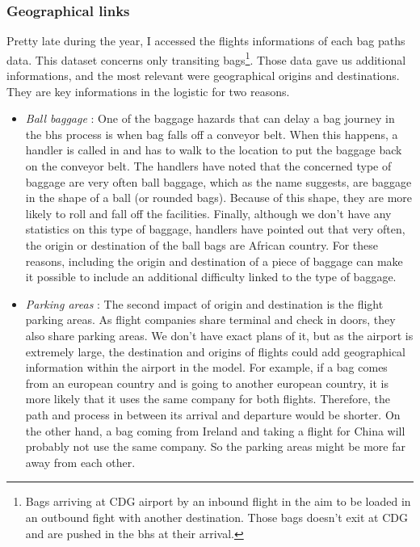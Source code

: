 \documentclass[12pt]{article}
\begin{document}
\subsubsection{Geographical links}

\noindent Pretty late during the year, I accessed the flights informations of each bag paths data. This dataset concerns only transiting bags\footnote{Bags arriving at CDG airport by an inbound flight in the aim to be loaded in an outbound fight with another destination. Those bags doesn't exit at CDG and are pushed in the \acrshort{bhs} at their arrival.}. Those data gave us additional informations, and the most relevant were geographical origins and destinations. They are key informations in the logistic for two reasons. 
\begin{itemize}
    \item \textit{Ball baggage} : One of the baggage hazards that can delay a bag journey in the \acrshort{bhs} process is when bag falls off a conveyor belt. When this happens, a handler is called in and has to walk to the location to put the baggage back on the conveyor belt. The handlers have noted that the concerned type of baggage are very often ball baggage, which as the name suggests, are baggage in the shape of a ball (or rounded bags). Because of this shape, they are more likely to roll and fall off the facilities. Finally, although we don't have any statistics on this type of baggage, handlers have pointed out that very often, the origin or destination of the ball bags are African country. For these reasons, including the origin and destination of a piece of baggage can make it possible to include an additional difficulty linked to the type of baggage.


    \item \textit{Parking areas} : The second impact of origin and destination is the flight parking areas. As flight companies share terminal and check in doors, they also share parking areas. We don't have exact plans of it, but as the airport is extremely large, the destination and origins of flights could add geographical information within the airport in the model. For example, if a bag comes from an european country and is going to another european country, it is more likely that it uses the same company for both flights. Therefore, the path and process in between its arrival and departure would be shorter. On the other hand, a bag coming from Ireland and taking a flight for China will probably not use the same company. So the parking areas might be more far away from each other.

\end{itemize}
\end{document}
